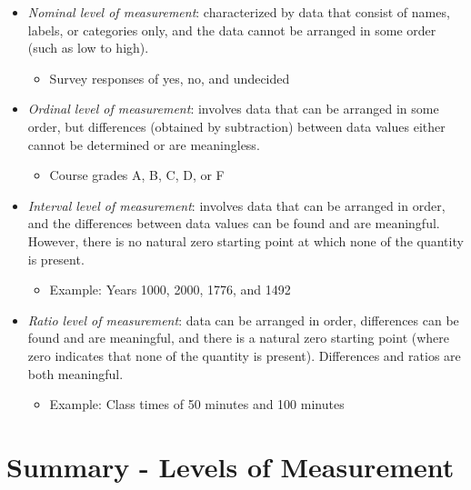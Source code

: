 \documentclass[]{book}
\providecommand{\tightlist}{%
  \setlength{\itemsep}{0pt}\setlength{\parskip}{0pt}}
\begin{document}
\begin{itemize}
\tightlist
\item
  \emph{Nominal level of measurement}: characterized by data that consist of names, labels, or categories only, and the data cannot be arranged in some order (such as low to high).

  \begin{itemize}
  \tightlist
  \item
    Survey responses of yes, no, and undecided
  \end{itemize}
\item
  \emph{Ordinal level of measurement}: involves data that can be arranged in some order, but differences (obtained by subtraction) between data values either cannot be determined or are meaningless.

  \begin{itemize}
  \tightlist
  \item
    Course grades A, B, C, D, or F
  \end{itemize}
\item
  \emph{Interval level of measurement}: involves data that can be arranged in order, and the differences between data values can be found and are meaningful. However, there is no natural zero starting point at which none of the quantity is present.

  \begin{itemize}
  \tightlist
  \item
    Example: Years 1000, 2000, 1776, and 1492
  \end{itemize}
\item
  \emph{Ratio level of measurement}: data can be arranged in order, differences can be found and are meaningful, and there is a natural zero starting point (where zero indicates that none of the quantity is present). Differences and ratios are both meaningful.

  \begin{itemize}
  \tightlist
  \item
    Example: Class times of 50 minutes and 100 minutes
  \end{itemize}
\end{itemize}

\hypertarget{summary---levels-of-measurement}{%
\section{Summary - Levels of Measurement}\label{summary---levels-of-measurement}}
\end{document}
